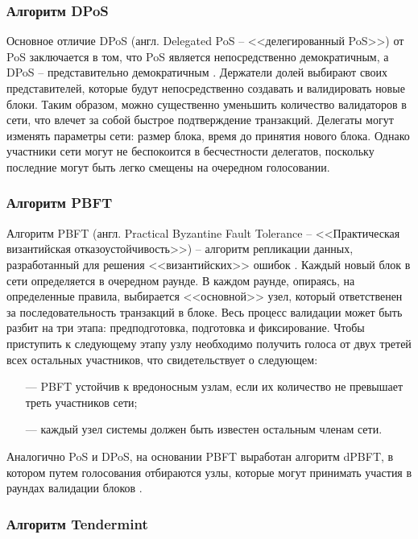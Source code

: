 \subsubsection{Алгоритм DPoS}

Основное отличие DPoS (англ. Delegated PoS -- <<делегированный PoS>>) от PoS заключается в том, что PoS является непосредственно демократичным, а DPoS -- представительно демократичным \cite{dpos}. Держатели долей выбирают своих представителей, которые будут непосредственно создавать и валидировать новые блоки. Таким образом, можно существенно уменьшить количество валидаторов в сети, что влечет за собой быстрое подтверждение транзакций. Делегаты могут изменять параметры сети: размер блока, время до принятия нового блока. Однако участники сети могут не беспокоится в бесчестности делегатов, поскольку последние могут быть легко смещены на очередном голосовании.

\subsubsection{Алгоритм PBFT}

Алгоритм PBFT (англ. Practical Byzantine Fault Tolerance -- <<Практическая византийская отказоустойчивость>>) -- алгоритм репликации данных, разработанный для решения <<византийских>> ошибок \cite{pbft}. Каждый новый блок в сети определяется в очередном раунде. В каждом раунде, опираясь, на определенные правила, выбирается <<основной>> узел, который ответственен за последовательность транзакций в блоке. Весь процесс валидации может быть разбит на три этапа: предподготовка, подготовка и фиксирование. Чтобы приступить к следующему этапу узлу необходимо получить голоса от двух третей всех остальных участников, что свидетельствует о следующем:
\begin{itemize}[leftmargin=1.6\parindent]
	\item[---] PBFT устойчив к вредоносным узлам, если их количество не превышает треть участников сети;
	\item[---] каждый узел системы должен быть известен остальным членам сети.
\end{itemize}

Аналогично PoS и DPoS, на основании PBFT выработан алгоритм dPBFT, в котором путем голосования отбираются узлы, которые могут принимать участия в раундах валидации блоков \cite{dpbft}.


\subsubsection{Алгоритм Tendermint}

